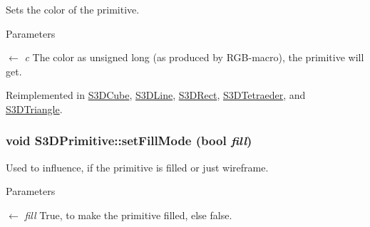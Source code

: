 Sets the color of the primitive. 


\begin{DoxyParams}{Parameters}
\item[\mbox{$\leftarrow$} {\em c}]The color as unsigned long (as produced by RGB-\/macro), the primitive will get. \end{DoxyParams}


Reimplemented in \hyperlink{class_s3_d_cube_a9c48875a16cc0ace3a3092e98663b785}{S3DCube}, \hyperlink{class_s3_d_line_a9feaf056477e858a7b0248a7b5cdd222}{S3DLine}, \hyperlink{class_s3_d_rect_af1a976fbe476e7096b2ceded7ab1659c}{S3DRect}, \hyperlink{class_s3_d_tetraeder_a99856377365e5c26c1f86155909725ed}{S3DTetraeder}, and \hyperlink{class_s3_d_triangle_a2c60503c3bae194ec8247a0e2467c915}{S3DTriangle}.

\hypertarget{class_s3_d_primitive_afd54077b1dbe256b9c6dfe67da7b0a0b}{
\subsubsection[{setFillMode}]{\setlength{\rightskip}{0pt plus 5cm}void S3DPrimitive::setFillMode (bool {\em fill})}}
\label{class_s3_d_primitive_afd54077b1dbe256b9c6dfe67da7b0a0b}


Used to influence, if the primitive is filled or just wireframe. 


\begin{DoxyParams}{Parameters}
\item[\mbox{$\leftarrow$} {\em fill}]True, to make the primitive filled, else false. \end{DoxyParams}


